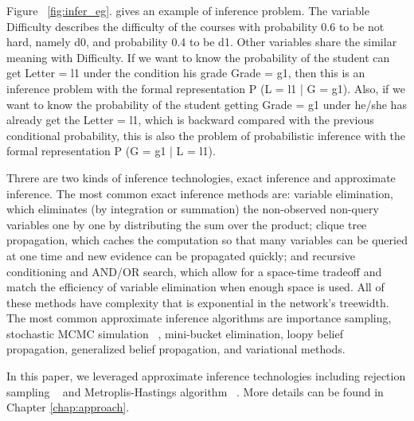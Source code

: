 Figure ~\ref{fig:infer_eg}. gives an example of inference problem. The variable Difficulty describes the difficulty of the courses with probability 0.6 to be not hard, namely d0, and probability 0.4 to be d1. Other variables share the similar meaning with Difficulty. If we want to know the probability of the student can get Letter = l1 under the condition his grade Grade = g1, then this is an inference problem with the formal representation P (L = l1 | G = g1). Also, if we want to know the probability of the student getting Grade = g1 under he/she has already get the Letter = l1, which is backward compared with the previous conditional probability, this is also the problem of probabilistic inference with the formal representation P (G = g1 | L = l1).

Threre are two kinds of inference technologies, exact inference and approximate inference. The most common exact inference methods are: variable elimination, which eliminates (by integration or summation) the non-observed non-query variables one by one by distributing the sum over the product; clique tree propagation, which caches the computation so that many variables can be queried at one time and new evidence can be propagated quickly; and recursive conditioning and AND/OR search, which allow for a space-time tradeoff and match the efficiency of variable elimination when enough space is used. All of these methods have complexity that is exponential in the network's treewidth. The most common approximate inference algorithms are importance sampling, stochastic MCMC simulation ~\cite{mcmc}, mini-bucket elimination, loopy belief propagation, generalized belief propagation, and variational methods.

In this paper, we leveraged approximate inference technologies including rejection sampling ~\cite{reject} and Metroplis-Hastings algorithm ~\cite{mh}. More details can be found in Chapter \ref{chap:approach}.

